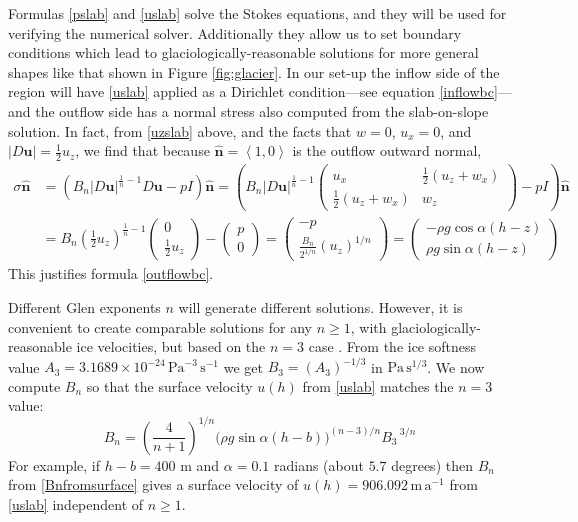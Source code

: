 \documentclass[letterpaper,final,12pt,reqno]{amsart}
\newcommand{\hbn}{\hat{\mathbf{n}}}
\newcommand{\bu}{\mathbf{u}}
\begin{document}
Formulas \eqref{pslab} and \eqref{uslab} solve the Stokes equations, and they will be used for verifying the numerical solver.  Additionally they allow us to set boundary conditions which lead to glaciologically-reasonable solutions for more general shapes like that shown in Figure \ref{fig:glacier}.  In our set-up the inflow side of the region will have \eqref{uslab} applied as a Dirichlet condition---see equation \eqref{inflowbc}---and the outflow side has a normal stress also computed from the slab-on-slope solution.  In fact, from \eqref{uzslab} above, and the facts that $w=0$, $u_x=0$, and $|D\bu| = \frac{1}{2} u_z$, we find that because $\hbn=\left<1,0\right>$ is the outflow outward normal,
\begin{align*}
\sigma \hbn &= \left(B_n |D\bu|^{\frac{1}{n}-1} D\bu - pI\right)\hbn = \left(B_n |D\bu|^{\frac{1}{n}-1} \begin{pmatrix} u_x & \frac{1}{2}(u_z+w_x) \\ \frac{1}{2}(u_z+w_x) & w_z \end{pmatrix} - pI\right)\hbn \\
    &= B_n \left(\frac{1}{2} u_z\right)^{\frac{1}{n}-1} \begin{pmatrix} 0 \\ \frac{1}{2} u_z \end{pmatrix} - \begin{pmatrix} p \\ 0 \end{pmatrix} = \begin{pmatrix} - p \\ \frac{B_n}{2^{1/n}} (u_z)^{1/n} \end{pmatrix} = \begin{pmatrix} - \rho g\cos\alpha (h-z) \\ \rho g\sin\alpha (h-z) \end{pmatrix}
\end{align*}
This justifies formula \eqref{outflowbc}.

Different Glen exponents $n$ will generate different solutions.  However, it is convenient to create comparable solutions for any $n\ge 1$, with glaciologically-reasonable ice velocities, but based on the $n=3$ case \cite{GreveBlatter2009}.  From the ice softness value $A_3 = 3.1689 \times 10^{-24} \,\text{Pa}^{-3}\,\text{s}^{-1}$ we get $B_3 = (A_3)^{-1/3}$ in $\text{Pa}\,\text{s}^{1/3}$.  We now compute $B_n$ so that the surface velocity $u(h)$ from \eqref{uslab} matches the $n=3$ value:
\begin{equation}
B_n = \left(\frac{4}{n+1}\right)^{1/n} \Big(\rho g \sin\alpha (h-b)\Big)^{(n-3)/n} {B_3\,}^{3/n}  \label{Bnfromsurface}
\end{equation}
For example, if $h-b=400$ m and $\alpha=0.1$ radians (about $5.7$ degrees) then $B_n$ from \eqref{Bnfromsurface} gives a surface velocity of $u(h)=906.092 \,\text{m}\,\text{a}^{-1}$ from \eqref{uslab} independent of $n\ge 1$.
\end{document}
